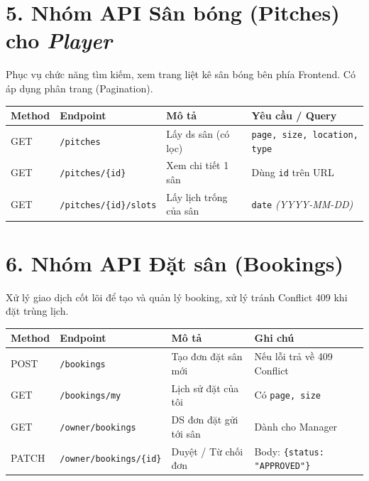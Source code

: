 \documentclass[12pt,a4paper]{article}
\begin{document}
\section*{5. Nhóm API Sân bóng (Pitches) cho \textit{Player}}
Phục vụ chức năng tìm kiếm, xem trang liệt kê sân bóng bên phía Frontend. Có áp dụng phân trang (Pagination).

\vspace{0.3cm}
\noindent
\renewcommand{\arraystretch}{1.3}
\begin{tabular}{|p{1.5cm}|p{4.5cm}|p{4.5cm}|p{4.5cm}|}
    \hline
    \textbf{Method} & \textbf{Endpoint} & \textbf{Mô tả} & \textbf{Yêu cầu / Query} \\
    \hline
    GET & \texttt{/pitches} & Lấy ds sân (có lọc) & \texttt{page, size, location, type} \\
    \hline
    GET & \texttt{/pitches/\{id\}} & Xem chi tiết 1 sân & Dùng \texttt{id} trên URL \\
    \hline
    GET & \texttt{/pitches/\{id\}/slots} & Lấy lịch trống của sân & \texttt{date} \textit{(YYYY-MM-DD)} \\
    \hline
\end{tabular}

\section*{6. Nhóm API Đặt sân (Bookings)}
Xử lý giao dịch cốt lõi để tạo và quản lý booking, xử lý tránh Conflict 409 khi đặt trùng lịch.

\vspace{0.3cm}
\noindent
\renewcommand{\arraystretch}{1.3}
\begin{tabular}{|p{1.5cm}|p{4.5cm}|p{4.5cm}|p{4.5cm}|}
    \hline
    \textbf{Method} & \textbf{Endpoint} & \textbf{Mô tả} & \textbf{Ghi chú} \\
    \hline
    POST & \texttt{/bookings} & Tạo đơn đặt sân mới & Nếu lỗi trả về 409 Conflict \\
    \hline
    GET & \texttt{/bookings/my} & Lịch sử đặt của tôi & Có \texttt{page, size} \\
    \hline
    GET & \texttt{/owner/bookings} & DS đơn đặt gửi tới sân & Dành cho Manager \\
    \hline
    PATCH & \texttt{/owner/bookings/\{id\}} & Duyệt / Từ chối đơn & Body: \texttt{\{status: "APPROVED"\}} \\
    \hline
\end{tabular}
\vspace{0.2cm}
\end{document}
